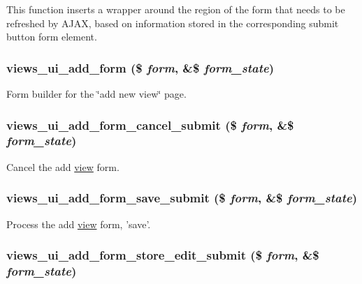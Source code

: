This function inserts a wrapper around the region of the form that needs to be refreshed by AJAX, based on information stored in the corresponding submit button form element. \hypertarget{admin_8inc_a82a525bcb27911c9d0bf7bfc4edd97ae}{
\subsubsection[{views\_\-ui\_\-add\_\-form}]{\setlength{\rightskip}{0pt plus 5cm}views\_\-ui\_\-add\_\-form (\$ {\em form}, \/  \&\$ {\em form\_\-state})}}
\label{admin_8inc_a82a525bcb27911c9d0bf7bfc4edd97ae}
Form builder for the \char`\"{}add new view\char`\"{} page. \hypertarget{admin_8inc_aa9704c35f74a5657fb704af30d149420}{
\subsubsection[{views\_\-ui\_\-add\_\-form\_\-cancel\_\-submit}]{\setlength{\rightskip}{0pt plus 5cm}views\_\-ui\_\-add\_\-form\_\-cancel\_\-submit (\$ {\em form}, \/  \&\$ {\em form\_\-state})}}
\label{admin_8inc_aa9704c35f74a5657fb704af30d149420}
Cancel the add \hyperlink{classview}{view} form. \hypertarget{admin_8inc_ac60900b322b65e56855a469e0d412877}{
\subsubsection[{views\_\-ui\_\-add\_\-form\_\-save\_\-submit}]{\setlength{\rightskip}{0pt plus 5cm}views\_\-ui\_\-add\_\-form\_\-save\_\-submit (\$ {\em form}, \/  \&\$ {\em form\_\-state})}}
\label{admin_8inc_ac60900b322b65e56855a469e0d412877}
Process the add \hyperlink{classview}{view} form, 'save'. \hypertarget{admin_8inc_ab93f3ab13bdb205a076d0d6d1ae95f9e}{
\subsubsection[{views\_\-ui\_\-add\_\-form\_\-store\_\-edit\_\-submit}]{\setlength{\rightskip}{0pt plus 5cm}views\_\-ui\_\-add\_\-form\_\-store\_\-edit\_\-submit (\$ {\em form}, \/  \&\$ {\em form\_\-state})}}
